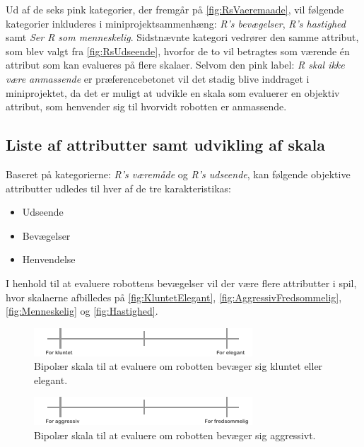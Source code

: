 \noindent
%
Ud af de seks pink kategorier, der fremgår på \autoref{fig:RsVaeremaade}, vil følgende kategorier inkluderes i miniprojektsammenhæng: \textit{R's bevægelser}, \textit{R's hastighed} samt \textit{Ser R som menneskelig}. Sidstnævnte kategori vedrører den samme attribut, som blev valgt fra \autoref{fig:RsUdseende}, hvorfor de to vil betragtes som værende én attribut som kan evalueres på flere skalaer. Selvom den pink label: \textit{R skal ikke være anmassende} er præferencebetonet vil det stadig blive inddraget i miniprojektet, da det er muligt at udvikle en skala som evaluerer en objektiv attribut, som henvender sig til hvorvidt robotten er anmassende.  

\subsection*{Liste af attributter samt udvikling af skala}
\label{ListeAttributterSkala}
%
Baseret på kategorierne: \textit{R's væremåde} og \textit{R's udseende}, kan følgende objektive attributter udledes til hver af de tre karakteristikas: \blankline
%
\begin{itemize}
  \item Udseende
  \item Bevægelser
  \item Henvendelse\blankline
\end{itemize}
%
I henhold til at evaluere robottens bevægelser vil der være flere attributter i spil, hvor skalaerne afbilledes på \autoref{fig:KluntetElegant}, \autoref{fig:AggressivFredsommelig}, \autoref{fig:Menneskelig} og \autoref{fig:Hastighed}.
%
\begin{figure}[H]
\centering
\includegraphics[width =\textwidth]{Figure/KluntetElegant} 
\caption{Bipolær skala til at evaluere om robotten bevæger sig kluntet eller elegant.}
\label{fig:KluntetElegant}
\end{figure}
\noindent
%
%
\begin{figure}[H]
\centering
\includegraphics[width =\textwidth]{Figure/AggressivFredsommelig} 
\caption{Bipolær skala til at evaluere om robotten bevæger sig aggressivt.}
\label{fig:AggressivFredsommelig}
\end{figure}
